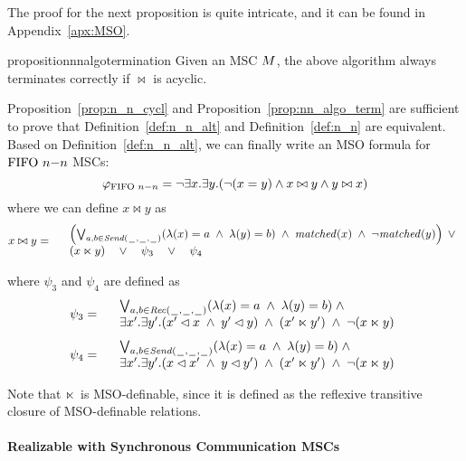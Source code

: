 
The proof for the next proposition is quite intricate, and it can be found in Appendix~\ref{apx:MSO}.

\begin{restatable}{proposition}{nnalgotermination}
\label{prop:nn_algo_term}
	Given an MSC $M$, the above algorithm always terminates correctly if $\bowtie$ is acyclic.
\end{restatable}

Proposition~\ref{prop:n_n_cycl} and Proposition~\ref{prop:nn_algo_term} are sufficient to prove that Definition~\ref{def:n_n_alt} and Definition~\ref{def:n_n} are equivalent.
Based on Definition~\ref{def:n_n_alt}, we can finally write an MSO formula for $\text{FIFO } n\mathsf{-}n$ MSCs:
\[
	\varphi_{\text{FIFO } n\mathsf{-}n} = \neg \exists x.\exists y.(\neg (x = y) \wedge x \bowtie y \wedge y \bowtie x)
\]
where we can define $x \bowtie y$ as
\[
	x \bowtie y =
	\begin{array}{rl}
	& \left(
		\bigvee_{\substack{a,b \in {\mathit{Send}(\hspace{0.1em}\underline{\hspace{0.5em}}\hspace{0.1em},\hspace{0.1em}\underline{\hspace{0.5em}}\hspace{0.1em},\hspace{0.1em}\underline{\hspace{0.5em}}\hspace{0.1em})}}}
		(\lambda(x) = a \;\wedge\; \lambda(y) = b)
		\;\wedge\; \mathit{matched}(x) \;\wedge\; \neg \mathit{matched}(y)
	\right) \;\vee\\
	& (x \ltimes y) \quad \vee \quad \psi_3 \quad \vee \quad \psi_4\\
	\end{array}
\]

\noindent where $\psi_3$ and $\psi_4$ are defined as
\[
	\psi_3 =
	\begin{array}{rl}
		& \bigvee_{\substack{a,b \in {\mathit{Rec}(\hspace{0.1em}\underline{\hspace{0.5em}}\hspace{0.1em},\hspace{0.1em}\underline{\hspace{0.5em}}\hspace{0.1em},\hspace{0.1em}\underline{\hspace{0.5em}}\hspace{0.1em})}}}
		  (\lambda(x) = a \;\wedge\; \lambda(y) = b)
		  \;\wedge\; \\
		& \exists x'.\exists y'.(x' \lhd x \;\wedge\; y' \lhd y) \;\wedge\; (x' \ltimes y') \;\wedge\; \neg(x \ltimes y)\\
	\end{array}
\]
\[
	\psi_4 =
	\begin{array}{rl}
		& \bigvee_{\substack{a,b \in {\mathit{Send}(\hspace{0.1em}\underline{\hspace{0.5em}}\hspace{0.1em},\hspace{0.1em}\underline{\hspace{0.5em}}\hspace{0.1em},\hspace{0.1em}\underline{\hspace{0.5em}}\hspace{0.1em})}}}
		  (\lambda(x) = a \;\wedge\; \lambda(y) = b)
		  \;\wedge\; \\
		& \exists x'.\exists y'.(x \lhd x' \;\wedge\; y \lhd y') \;\wedge\; (x' \ltimes y') \;\wedge\; \neg(x \ltimes y)\\
	\end{array}
\]

Note that $\ltimes$ is MSO-definable, since it is defined as the reflexive transitive closure of MSO-definable relations.

\paragraph{\bf Realizable with Synchronous Communication MSCs} 

